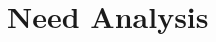 \begin{comment}
        	\subsection{International Status Review}
        	\begin{itemize}
        		\item Debraj Basu, \textbf{"Wireless Sensor Network Based DSAda Smart Home: Sensor Selection, Deployment and Monitoring"}, IEEE, 2013\\ \\
        		Debraj Basu details the installation and configuration of unobtrusive sensors in an elderly person?s house - a smart home in the making - in a small city in New Zealand. The overall system is envisaged to use machine learning to analyze the data generated by the sensor nodes.
        		\item Byeongkwan Kang, \textbf{IoT-based monitoring system using tri-level context making model for smart home services"}, IEEE International Conference, 2015\\ \\
        		Kang discusses about acquisition and analysis of sensor data which are going to be used across smart homes. It proposed an architecture for extracting contextual information by analysing the data acquired from various sensors and provide context aware services.
        		\item Jeya Jeya Padmini, \textbf{"Effective Power Utilization and Conservation in Smart Home Using IoT"}, IEEE International Conference, 2015\\ \\
        		Jeya Jeya Padmini discusses about effective power utilization and conservation in smart homes using IoT. It uses cameras for recognizing human activities through image processing techniques.
        		\item Pranay P. Gaikwad, \textbf{"A Survey based on Smart Home System Using Internet of Things"}, IEEE International Conference, 2015\\ \\
        		Pranay P.Gaikwad discusses about challenges and problems arise in smart home systems using IoT and propose possible solutions.
        	\end{itemize}
        	\end{comment}
        \section{Need Analysis}
        
